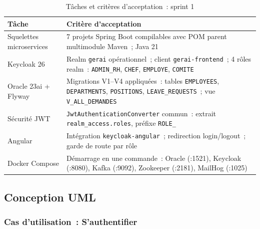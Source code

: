 \begin{table}[H]
\centering
\caption{Tâches et critères d'acceptation~: sprint 1}
\label{tab:s1_obj}
\begin{tabularx}{\textwidth}{|l|L|}
\hline
{}\textbf{Tâche} & \textbf{Critère d'acceptation} \\\hline
{}
Squelettes microservices & 7 projets Spring Boot compilables avec POM parent
  multimodule Maven~; Java 21 \\\hline
Keycloak 26 & Realm \texttt{gerai} opérationnel~; client \texttt{gerai-frontend}~;
  4 rôles realm~: \texttt{ADMIN\_RH}, \texttt{CHEF}, \texttt{EMPLOYE}, \texttt{COMITE} \\\hline
{}
Oracle 23ai + Flyway & Migrations V1--V4 appliquées~: tables \texttt{EMPLOYEES},
  \texttt{DEPARTMENTS}, \texttt{POSITIONS}, \texttt{LEAVE\_REQUESTS}~;
  vue \texttt{V\_ALL\_DEMANDES} \\\hline
Sécurité JWT & \texttt{JwtAuthenticationConverter} commun~: extrait
  \texttt{realm\_access.roles}, préfixe \texttt{ROLE\_} \\\hline
{}
Angular & Intégration \texttt{keycloak-angular}~; redirection login/logout~;
  garde de route par rôle \\\hline
Docker Compose & Démarrage en une commande~: Oracle (:1521), Keycloak (:8080),
  Kafka (:9092), Zookeeper (:2181), MailHog (:1025) \\\hline
\end{tabularx}
\end{table}

\subsection{Conception UML}

\subsubsection*{Cas d'utilisation~: S'authentifier}

